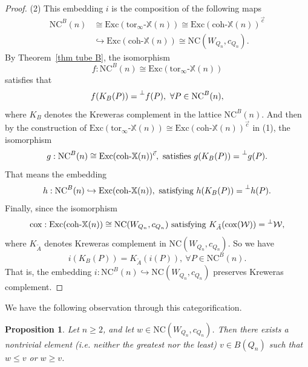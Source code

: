 \documentclass[a4paper, 11pt, reqno]{amsart}
\numberwithin{equation}{section}
\newtheorem{prop}[thm]{Proposition}
\theoremstyle{remark}
\theoremstyle{definition}
\begin{document}
\begin{proof}
   (2) This embedding $i$ is the composition of the following maps
   \begin{align*}
      \mathrm{NC}^B(n) &\cong \mathrm{Exc}(\mathrm{tor}_{\infty} \text{-} \mathbb X(n)) \cong \mathrm{Exc}(\mathrm{coh} \text{-} \mathbb X(n))^{\vec c} \\ &\hookrightarrow \mathrm{Exc}(\mathrm{coh} \text{-} \mathbb X(n)) \cong \mathrm{NC}(W_{Q_n},c_{Q_n}).
   \end{align*}
   By Theorem~\ref{thm tube B}, the isomorphism 
   \[f: \mathrm{NC}^B(n) \cong \mathrm{Exc}(\mathrm{tor}_{\infty} \text{-} \mathbb X(n))\]
   satisfies that 
   \[f(K_B(P))=\prescript{\perp}{}{f(P)}, \ \forall P \in \mathrm{NC}^B(n),\]
   where $K_B$ denotes the Kreweras complement in the lattice $\mathrm{NC}^B(n)$. And then by the construction of $\mathrm{Exc}(\mathrm{tor}_{\infty} \text{-} \mathbb X(n)) \cong \mathrm{Exc}(\mathrm{coh} \text{-} \mathbb X(n))^{\vec c}$ in (1), the isomorphism 
   \[g: \mathrm{NC}^B(n) \cong \mathrm{Exc}(\mathrm{coh} \text{-} \mathbb X(n))^{\vec c}, \text{ satisfies } g(K_B(P))=\prescript{\perp}{}{g(P)}.\]
   That means the embedding
   \[h: \mathrm{NC}^B(n) \hookrightarrow \mathrm{Exc}(\mathrm{coh} \text{-} \mathbb X(n)), \text{ satisfying } h(K_B(P))=\prescript{\perp}{}{h(P)}.\]
   Finally, since the isomorphism 
   \[\mathrm{cox}: \mathrm{Exc}(\mathrm{coh} \text{-} \mathbb X(n)) \cong \mathrm{NC}(W_{Q_n},c_{Q_n}) \text{ satisfying } K_{\tilde A}(\mathrm{cox}(\mathcal W))=\mathrm{\prescript{\perp}{}{\mathcal W}},\]
   where $K_{\tilde A}$ denotes Kreweras complement in $\mathrm{NC}(W_{Q_n},c_{Q_n})$. So we have 
   \[
     i(K_B(P))=K_{\tilde A}(i(P)), \ \forall P \in \mathrm{NC}^B(n).
   \]
   That is, the embedding $i: \mathrm{NC}^B(n) \hookrightarrow \mathrm{NC}(W_{Q_n},c_{Q_n})$ preserves Kreweras complement.
\end{proof}

We have the following observation through this categorification.

\begin{prop} \label{prop clamp}
   Let $n \geq 2$, and let $w \in \mathrm{NC}(W_{Q_n},c_{Q_n})$. Then there exists a nontrivial element (i.e. neither the greatest nor the least) $v \in B(Q_n)$ such that $w \leq v$ or $w \geq v$.
\end{prop}
\end{document}

